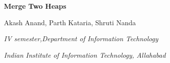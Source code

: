 \setlength{\topsep}{0pt}\setlength{\parindent}{0pt}



\renewcommand{\arraystretch}{1.3}






\begin{adjustwidth}{-0.25in}{-0.44in}
\begin{Center}
{\fontsize{14pt}{16.8pt}\selectfont \textbf{Merge Two Heaps }\par}
\end{Center}\par

\end{adjustwidth}

\begin{Center}
Akash Anand, Parth Kataria, Shruti Nanda
\end{Center}\par

\par

\begin{Center}
\textit{IV semester,Department of Information Technology}
\end{Center}\par

\begin{Center}
\textit{Indian Institute of Information Technology, Allahabad}
\end{Center}\par


